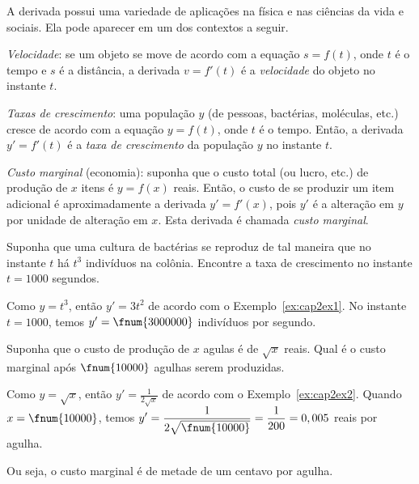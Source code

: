 
A derivada possui uma variedade de aplicações na física e nas ciências
da vida e sociais. Ela pode aparecer em um dos contextos a seguir.

\emph{Velocidade}: se um objeto se move de acordo com a equação $s = f(t)$,
onde $t$ é o tempo e $s$ é a distância, a derivada $v = f'(t)$ é a
\emph{velocidade} do objeto no instante $t$.

\emph{Taxas de crescimento}: uma população $y$ (de pessoas, bactérias,
moléculas, etc.) cresce de acordo com a equação $y = f(t)$, onde $t$ é
o tempo. Então, a derivada $y' = f'(t)$ é a \emph{taxa de crescimento}
da população $y$ no instante $t$.

\emph{Custo marginal} (economia): suponha que o custo total (ou lucro,
etc.) de produção de $x$ itens é $y = f(x)$ reais. Então, o custo de
se produzir um item adicional é aproximadamente a derivada $y' = f'(x)$,
pois $y'$ é a alteração em $y$ por unidade de alteração em $x$. Esta
derivada é chamada \emph{custo marginal}.

\begin{example}
Suponha que uma cultura de bactérias se reproduz de tal maneira que
no instante $t$ há $t^3$ indivíduos na colônia. Encontre a taxa de
crescimento no instante $t = 1000$ segundos.

Como $y = t^3$, então $y' = 3t^2$ de acordo com o Exemplo~\ref{ex:cap2ex1}.
No instante $t = 1000$, temos $y' = \fnum{3000000}$ indivíduos por segundo.
\end{example}

\begin{example}
Suponha que o custo de produção de $x$ agulas é de $\sqrt{x}$ reais. Qual é
o custo marginal após $\fnum{10000}$ agulhas serem produzidas.

Como $y = \sqrt{x}$, então $\displaystyle y' = \frac{1}{2\sqrt{x}}$ de acordo com o Exemplo~\ref{ex:cap2ex2}. Quando $x = \fnum{10000}$, temos $\displaystyle y' = \frac{1}{2\sqrt{\fnum{10000}}} = \frac{1}{200} = 0,005$ reais por agulha.

Ou seja, o custo marginal é de metade de um centavo por agulha.
\end{example}

